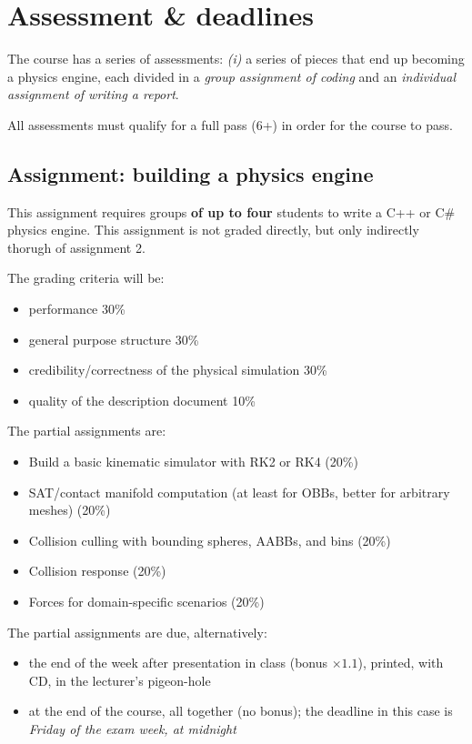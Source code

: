 \documentclass{article}
\begin{document}
\section{Assessment \& deadlines}
The course has a series of assessments: \textit{(i)} a series of pieces that end up becoming a physics engine, each divided in a \textit{group assignment of coding} and an \textit{individual assignment of writing a report}.

All assessments must qualify for a full pass (6+) in order for the course to pass.


\subsection{Assignment: building a physics engine}
This assignment requires groups \textbf{of up to four} students to write a C++ or C\# physics engine. This assignment is not graded directly, but only indirectly thorugh of assignment 2.

The grading criteria will be:
\begin{itemize}
\item performance 30\%
\item general purpose structure 30\%
\item credibility/correctness of the physical simulation 30\%
\item quality of the description document 10\%
\end{itemize}

The partial assignments are:
\begin{itemize}
\item Build a basic kinematic simulator with RK2 or RK4 (20\%)
\item SAT/contact manifold computation (at least for OBBs, better for arbitrary meshes) (20\%)
\item Collision culling with bounding spheres, AABBs, and bins (20\%)
\item Collision response (20\%)
\item Forces for domain-specific scenarios (20\%)
\end{itemize}

The partial assignments are due, alternatively:
\begin{itemize}
\item the end of the week after presentation in class (bonus $\times 1.1$), printed, with CD, in the lecturer's pigeon-hole
\item at the end of the course, all together (no bonus); the deadline in this case is \textit{Friday of the exam week, at midnight}
\end{itemize}
\end{document}

